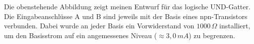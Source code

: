 Die obenstehende Abbildung zeigt meinen Entwurf für das logische UND-Gatter. Die Eingabeanschlüsse A und B sind jeweils mit der Basis eines npn-Transistors verbunden. Dabei wurde an jeder Basis ein Vorwiderstand von $1000\,\Omega$ installiert, um den Basisstrom auf ein angemessenes Niveau ($\approx 3,0\, mA$) zu begrenzen.
